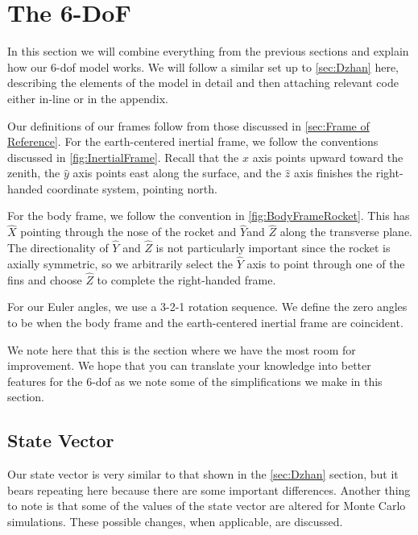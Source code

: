 \documentclass[12pt]{report}
\begin{document}
\chapter{The 6-DoF}
In this section we will combine everything from the previous sections and explain how our 6-\gls{dof} model works. We will follow a similar set up to \ref{sec:Dzhan}  here, describing the elements of the model in detail and then attaching relevant code either in-line or in the appendix.

Our definitions of our frames follow from those discussed in \ref{sec:Frame of Reference}. For the earth-centered inertial frame, we follow the conventions discussed in \ref{fig:InertialFrame}. Recall that the $\hat{x}$ axis points upward toward the zenith, the $\hat{y}$ axis points east along the surface, and the $\hat{z}$ axis finishes the right-handed coordinate system, pointing north.

For the body frame, we follow the convention in \ref{fig:BodyFrameRocket}. This has $\hat{X}$ pointing through the nose of the rocket and $\hat{Y}$and $\hat{Z}$ along the transverse plane. The directionality of $\hat{Y}$ and $\hat{Z}$ is not particularly important since the rocket is axially symmetric, so we arbitrarily select the $\hat{Y}$ axis to point through one of the fins and choose $\hat{Z}$ to complete the right-handed frame.

For our \gls{Euler angles}, we use a 3-2-1 rotation sequence. We define the zero angles to be when the body frame and the earth-centered inertial frame are coincident.

We note here that this is the section where we have the most room for improvement. We hope that you can translate your knowledge into better features for the 6-\gls{dof} as we note some of the simplifications we make in this section.

\section{State Vector}
Our \gls{state vector} is very similar to that shown in the \ref{sec:Dzhan} section, but it bears repeating here because there are some important differences. Another thing to note is that some of the values of the \gls{state vector} are altered for Monte Carlo simulations. These possible changes, when applicable, are discussed.
\end{document}
